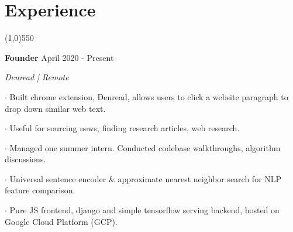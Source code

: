 \documentclass[11pt]{article} %
\begin{document}
	\section*{Experience}
	\vspace{-7ex}
	\begin{center}
    \line(1,0){550}
    \end{center}
    \vspace{+0ex}
    \textbf{\large Founder} \hfill April 2020 - Present
    \setlength{\parindent}{-0ex} \par
    \textit{Denread | Remote} \vspace{+3ex} \par
    $\boldsymbol{\cdot}$ Built chrome extension, Denread, allows users to click a website paragraph to drop down similar web text. \par \vspace{+1ex}
    $\boldsymbol{\cdot}$ Useful for sourcing news, finding research articles, web research. \par \vspace{+1ex}
    $\boldsymbol{\cdot}$ Managed one summer intern. Conducted codebase walkthroughs, algorithm discussions. \par \vspace{+1ex}
    $\boldsymbol{\cdot}$ Universal sentence encoder \& approximate nearest neighbor search for NLP feature comparison.\par \vspace{+1ex}
    $\boldsymbol{\cdot}$ Pure JS frontend, django and simple tensorflow serving backend, hosted on Google Cloud Platform (GCP). \par 
\end{document}
